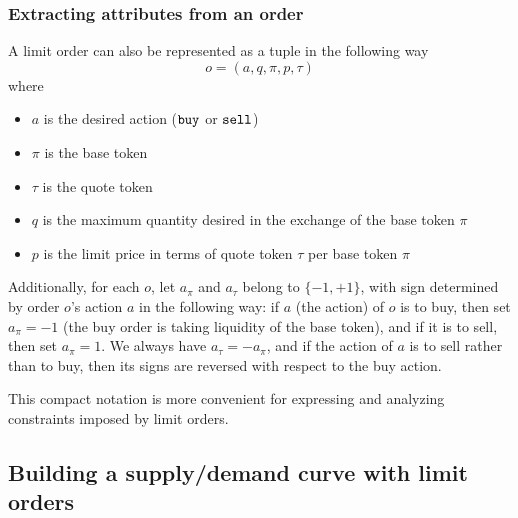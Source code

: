 \documentclass[11pt, reqno]{amsart}
\theoremstyle{definition}
\theoremstyle{remark}
\newcommand{\buy}{\textnormal{\texttt{buy}}}
\newcommand{\sell}{\textnormal{\texttt{sell}}}
\begin{document}
\subsubsection{Extracting attributes from an order}
A limit order can also be represented as a tuple in the following way
\[
	o = (a, q, \pi, p, \tau)
\]
where
\begin{itemize}
	\item $a$ is the desired action ($\buy$ or $\sell$)
    \item $\pi$ is the base token
    \item $\tau$ is the quote token
    \item $q$ is the maximum quantity desired in the exchange of the base token
          $\pi$
	\item $p$ is the limit price in terms of quote token $\tau$ per base token
          $\pi$
\end{itemize}
Additionally, for each $o$, let $a_\pi$ and $a_\tau$ belong to
$\{-1, +1\}$, with sign determined by order $o$'s action $a$ in the following
way: if $a$ (the action) of $o$ is to buy, then set $a_\pi = -1$ (the buy
order is taking liquidity of the base token), and if it is to sell, then
set $a_\pi = 1$. We always have $a_\tau = -a_\pi$, and if the action
of $a$ is to sell rather than to buy, then its signs are reversed with
respect to the buy action.

This compact notation is more convenient for expressing and analyzing
constraints imposed by limit orders.

\subsection{Building a supply/demand curve with limit orders}
\end{document}
